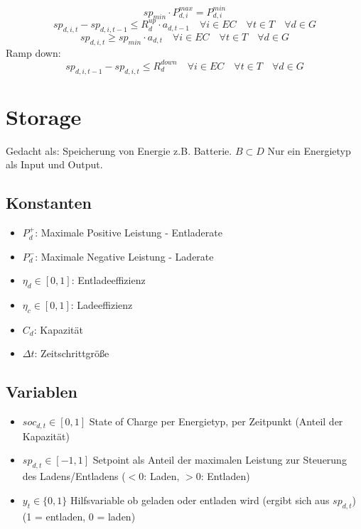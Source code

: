 \documentclass[]{article}
\begin{document}
\begin{equation}
    sp_{min} \cdot P_{d,i}^{max} = P_{d,i}^{min}
\end{equation}
\begin{equation}
    sp_{d,i,t} - sp_{d,i,t-1} \leq R_{d}^{up} \cdot a_{d,t - 1} \quad \forall i \in EC \quad \forall t \in T \quad \forall d \in G
\end{equation}
\begin{equation}
    sp_{d,i,t} \geq sp_{min} \cdot a_{d,t} \quad \forall i \in EC \quad \forall t \in T \quad \forall d \in G
\end{equation}
Ramp down:
\begin{equation}
    sp_{d,i,t-1} - sp_{d,i,t} \leq R_{d}^{down} \quad \forall i \in EC \quad \forall t \in T \quad \forall d \in G
\end{equation}
\section{Storage}
Gedacht als: Speicherung von Energie z.B. Batterie. $B \subset D$ Nur ein Energietyp als Input und Output.
\subsection{Konstanten}
\begin{itemize}
    \item $P_{d}^{+}$: Maximale Positive Leistung - Entladerate
    \item $P_{d}^{-}$: Maximale Negative Leistung - Laderate
    \item $\eta_{d} \in [0,1]$: Entladeeffizienz
    \item $\eta_{c} \in [0,1]$: Ladeeffizienz
    \item $C_{d}$: Kapazität
    \item $\Delta t$: Zeitschrittgröße
\end{itemize}
\subsection{Variablen}
\begin{itemize}
    \item $soc_{d,t} \in [0,1]$ State of Charge per Energietyp, per Zeitpunkt (Anteil der Kapazität)
    \item $sp_{d,t} \in [-1,1]$ Setpoint als Anteil der maximalen Leistung zur Steuerung des Ladens/Entladens ($<0$: Laden, $>0$: Entladen)
    \item $y_t \in \{0,1\}$ Hilfsvariable ob geladen oder entladen wird (ergibt sich aus $sp_{d,t}$) (1 = entladen, 0 = laden)
\end{itemize}
\end{document}
